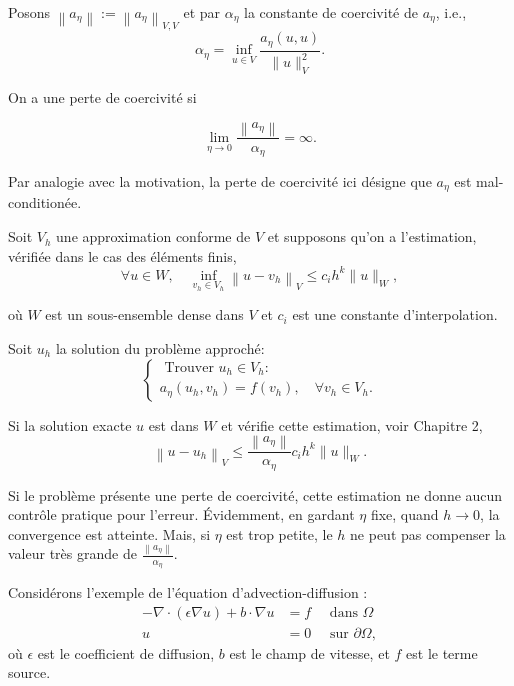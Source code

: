 Posons $\left\|a_{\eta}\right\|:=\left\|a_{\eta}\right\|_{V, V}$ et par  $\alpha_{\eta}$ la constante de  coercivité de  $a_{\eta}$, i.e.,
$$
\alpha_{\eta}=\inf _{u \in V} \frac{a_{\eta}(u, u)}{\|u\|_{V}^{2}}.
$$
\begin{definition}

On a une perte de coercivité  si

$$
\lim _{\eta \rightarrow 0} \frac{\left\|a_{\eta}\right\|}{\alpha_{\eta}}=\infty. 
$$

\end{definition}
Par analogie avec la motivation,   la perte de  coercivité ici désigne que  $a_\eta$ est mal-conditionée.

Soit  $V_{h}$ une approximation conforme de  $V$ et supposons qu'on a l'estimation, vérifiée dans le cas des éléments finis,  
$$
\forall u \in W, \quad \inf _{v_{h} \in V_{h}}\left\|u-v_{h}\right\|_{V} \leq c_{i} h^{k}\|u\|_{W}, 
$$

où  $W$ est un sous-ensemble dense dans  $V$  et  $c_i$  est une constante d'interpolation.  

Soit  $u_{h}$  la solution du problème approché:
$$
\left\{\begin{array}{l}
	\text { Trouver  } u_{h} \in V_{h} : \\
	a_{\eta}\left(u_{h}, v_{h}\right)=f\left(v_{h}\right), \quad \forall v_{h} \in V_{h}.
\end{array}\right.
$$

Si la solution exacte $u$  est dans  $W$ et vérifie cette estimation, voir Chapitre 2, 
$$
\left\|u-u_{h}\right\|_{V} \leq \frac{\left\|a_{\eta}\right\|}{\alpha_{\eta}} c_{i} h^{k}\|u\|_{W}.
$$

Si le problème présente une perte de coercivité, cette estimation  ne donne aucun contrôle pratique pour  l'erreur. Évidemment, en gardant $\eta$ fixe, quand  $h \rightarrow 0$, la convergence est atteinte.  Mais, si $\eta$ est trop petite, le $h$ ne peut pas compenser la valeur très grande de $\frac{\left\|a_{\eta}\right\|}{\alpha_{\eta}}$. 


Considérons l'exemple de l'équation  d'advection-diffusion :
$$
\begin{aligned}
	-\nabla \cdot(\epsilon \nabla u)+b\cdot \nabla u &=f \quad \text { dans  } \Omega \\
	u &=0\quad \text { sur   }  \partial\Omega, 
\end{aligned}
$$
où  $\epsilon$ est  le  coefficient de diffusion, $b$ est le champ de  vitesse,  et $f$ est le terme  source.   

